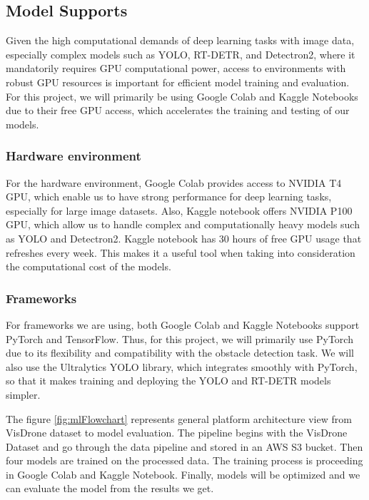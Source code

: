 \documentclass[stu,12pt,floatsintext]{apa7}
\begin{document}
\subsection{Model Supports}
Given the high computational demands of deep learning tasks with image data, especially complex models such as YOLO, RT-DETR, and Detectron2, where it mandatorily requires GPU computational power, access to environments with robust GPU resources is important for efficient model training and evaluation. For this project, we will primarily be using Google Colab and Kaggle Notebooks due to their free GPU access, which accelerates the training and testing of our models.


\subsubsection{Hardware environment}
For the hardware environment, Google Colab provides access to NVIDIA T4 GPU, which enable us to have strong performance for deep learning tasks, especially for large image datasets. Also, Kaggle notebook offers NVIDIA P100 GPU, which allow us to handle complex and computationally heavy models such as YOLO and Detectron2. Kaggle notebook has 30 hours of free GPU usage that refreshes every week. This makes it a useful tool when taking into consideration the computational cost of the models.

\subsubsection{Frameworks}
For frameworks we are using, both Google Colab and Kaggle Notebooks support PyTorch and TensorFlow. Thus, for this project, we will primarily use PyTorch due to its flexibility and compatibility with the obstacle detection task. We will also use the Ultralytics YOLO library, which integrates smoothly with PyTorch, so that it makes training and deploying the YOLO and RT-DETR models simpler.


The figure \ref{fig:mlFlowchart} represents general platform architecture view from VisDrone dataset to model evaluation. The pipeline begins with the VisDrone Dataset and go through the data pipeline and stored in an AWS S3 bucket. Then four models are trained on the processed data. The training process is proceeding in Google Colab and Kaggle Notebook. Finally, models will be optimized and we can evaluate the model from the results we get.
\end{document}
